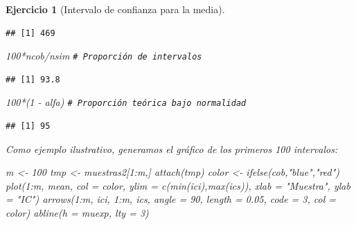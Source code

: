 \documentclass[
]{book}
\newenvironment{Shaded}{\begin{snugshade}}{\end{snugshade}}
\newcommand{\AttributeTok}[1]{\textcolor[rgb]{0.77,0.63,0.00}{#1}}
\newcommand{\CommentTok}[1]{\textcolor[rgb]{0.56,0.35,0.01}{\textit{#1}}}
\newcommand{\DecValTok}[1]{\textcolor[rgb]{0.00,0.00,0.81}{#1}}
\newcommand{\FloatTok}[1]{\textcolor[rgb]{0.00,0.00,0.81}{#1}}
\newcommand{\FunctionTok}[1]{\textcolor[rgb]{0.00,0.00,0.00}{#1}}
\newcommand{\NormalTok}[1]{#1}
\newcommand{\OtherTok}[1]{\textcolor[rgb]{0.56,0.35,0.01}{#1}}
\newcommand{\SpecialCharTok}[1]{\textcolor[rgb]{0.00,0.00,0.00}{#1}}
\newcommand{\StringTok}[1]{\textcolor[rgb]{0.31,0.60,0.02}{#1}}
\theoremstyle{break}
\newtheorem{exercise}{Ejercicio}[chapter]
\theoremstyle{nonumberplain}
\renewcommand{\CommentTok}[1]{\textcolor[rgb]{0.41,0.41,0.41}{\texttt{#1}}}
\begin{document}
\begin{exercise}[Intervalo de confianza para la media]
\begin{enumerate}
\begin{verbatim}
## [1] 469
\end{verbatim}

\begin{Shaded}
\begin{Highlighting}[]
\DecValTok{100}\SpecialCharTok{*}\NormalTok{ncob}\SpecialCharTok{/}\NormalTok{nsim     }\CommentTok{\# Proporción de intervalos}
\end{Highlighting}
\end{Shaded}

\begin{verbatim}
## [1] 93.8
\end{verbatim}

\begin{Shaded}
\begin{Highlighting}[]
\DecValTok{100}\SpecialCharTok{*}\NormalTok{(}\DecValTok{1} \SpecialCharTok{{-}}\NormalTok{ alfa)    }\CommentTok{\# Proporción teórica bajo normalidad}
\end{Highlighting}
\end{Shaded}

\begin{verbatim}
## [1] 95
\end{verbatim}

  Como ejemplo ilustrativo, generamos el gráfico de los primeros 100 intervalos:

\begin{Shaded}
\begin{Highlighting}[]
\NormalTok{m }\OtherTok{\textless{}{-}} \DecValTok{100}
\NormalTok{tmp }\OtherTok{\textless{}{-}}\NormalTok{ muestras2[}\DecValTok{1}\SpecialCharTok{:}\NormalTok{m,]}
\FunctionTok{attach}\NormalTok{(tmp)}
\NormalTok{color }\OtherTok{\textless{}{-}} \FunctionTok{ifelse}\NormalTok{(cob,}\StringTok{"blue"}\NormalTok{,}\StringTok{"red"}\NormalTok{)}
\FunctionTok{plot}\NormalTok{(}\DecValTok{1}\SpecialCharTok{:}\NormalTok{m, mean, }\AttributeTok{col =}\NormalTok{ color, }\AttributeTok{ylim =} \FunctionTok{c}\NormalTok{(}\FunctionTok{min}\NormalTok{(ici),}\FunctionTok{max}\NormalTok{(ics)), }
     \AttributeTok{xlab =} \StringTok{"Muestra"}\NormalTok{, }\AttributeTok{ylab =} \StringTok{"IC"}\NormalTok{)}
\FunctionTok{arrows}\NormalTok{(}\DecValTok{1}\SpecialCharTok{:}\NormalTok{m, ici, }\DecValTok{1}\SpecialCharTok{:}\NormalTok{m, ics, }\AttributeTok{angle =} \DecValTok{90}\NormalTok{, }\AttributeTok{length =} \FloatTok{0.05}\NormalTok{, }\AttributeTok{code =} \DecValTok{3}\NormalTok{, }\AttributeTok{col =}\NormalTok{ color)}
\FunctionTok{abline}\NormalTok{(}\AttributeTok{h =}\NormalTok{ muexp, }\AttributeTok{lty =} \DecValTok{3}\NormalTok{)}
\end{Highlighting}
\end{Shaded}


\end{enumerate}
\end{exercise}
\end{document}
